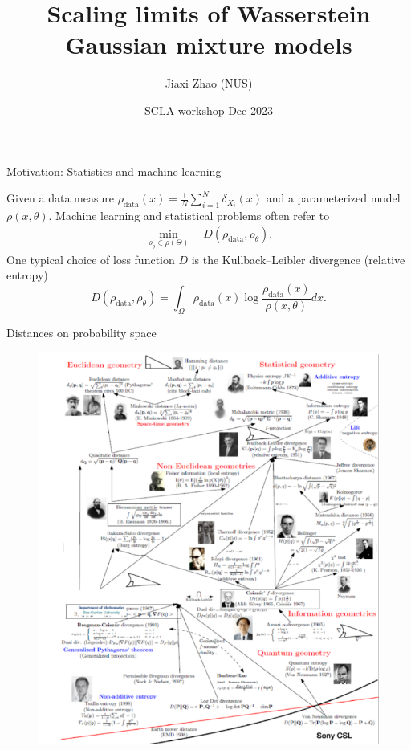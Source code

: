 \documentclass{beamer}
\title[Scaling limits of Wasserstein GMMs]{Scaling limits of Wasserstein Gaussian mixture models}
\author{Jiaxi Zhao (NUS)}
\institute[]{joint work with Wuchen Li (USC)}
\date{SCLA workshop Dec 2023}
\begin{document}
\par \setlength{\parindent}{2em}


\begin{frame}
\titlepage
\end{frame}

\begin{frame}{Motivation: Statistics and machine learning}
\par
Given a data measure $\rho_{\textrm{data}}(x)=\frac{1}{N}\sum_{i=1}^N\delta_{X_i}(x)$ and a parameterized model $\rho(x, \theta)$. 
Machine learning and statistical problems
often refer to
\begin{equation*}
\begin{split}
\min_{\rho_\theta\in \rho(\Theta)}\quad D(\rho_{\textrm{data}}, \rho_\theta).
\end{split}
\end{equation*}
One typical choice of loss function $D$ is the Kullback--Leibler divergence (relative entropy) $$D(\rho_{\textrm{data}}, \rho_\theta)=\int_{\Omega}\rho_{\textrm{data}}(x)\log\frac{\rho_{\textrm{data}}(x)}{\rho(x,\theta)}dx.$$
\end{frame}

\begin{frame}{Distances on probability space}
    \begin{figure}[H]
          \centering
          \centerline{\includegraphics[width=0.6\linewidth]{history.png}}
        \end{figure}
\end{frame}
\end{document}
